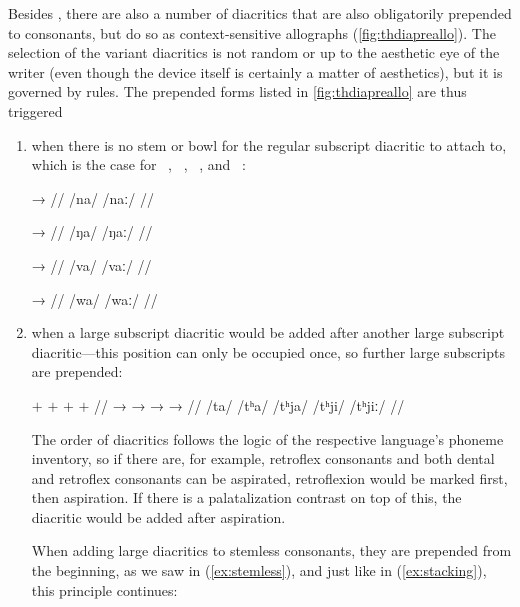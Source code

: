Besides , there are also a number of diacritics that are also 
obligatorily prepended to consonants, but do so as context-sensitive allographs 
(\autoref{fig:thdiapreallo}). The selection of the variant diacritics is not 
random or up to the aesthetic eye of the writer (even though the device itself 
is certainly a matter of aesthetics), but it is governed by rules. The 
prepended forms listed in \autoref{fig:thdiapreallo} are thus triggered 

\begin{enumerate}
\item when there is no stem or bowl for the regular subscript diacritic to 
	attach to, which is the case for ~, ~, 
	~, and ~:
	
	\begin{multicols}{2}
	\pex[lingstyle=thex,]\label{ex:stemless}
	\a\begingl
		\gla {} →  //
		\glb /na/ {} /naː/ //
	\endgl
	
	\a\begingl
		\gla {} →  //
		\glb /ŋa/ {} /ŋaː/ //
	\endgl
	
	\a\begingl
		\gla {} →  //
		\glb /va/ {} /vaː/ //
	\endgl
	
	\a\begingl
		\gla {} →  //
		\glb /wa/ {} /waː/ //
	\endgl
	
	\xe
	\end{multicols}

\item when a large subscript diacritic would be added after another large 
	subscript diacritic---this position can only be occupied once, so 
	further large subscripts are prepended:
	
	\ex[lingstyle=thex,everygla=\normalsize,everyglb=\upshape\Large,
		aboveglcskip=0.5em,numoffset=\leftmargin]\label{ex:stacking}
	\begingl
		\gla {} {$+$ } {} {$+$ } {} {$+$ } {}
			{$+$ } {} //
		\glb {} →  →  →  → 
			 //
		\glc /ta/ {} /tʰa/ {} /tʰja/ {} /tʰji/ {} /tʰjiː/ //
	\endgl\xe
	
	The order of diacritics follows the logic of the respective 
	language's phoneme inventory, so if there are, for example, 
	retroflex consonants and both dental and retroflex consonants can be 
	aspirated, retroflexion would be marked first, then aspiration. If 
	there is a palatalization contrast on top of this, the diacritic would 
	be added after aspiration.
	
	When adding large diacritics to stemless consonants, they are prepended 
	from the beginning, as we saw in (\ref{ex:stemless}), and just like in 
	(\ref{ex:stacking}), this principle continues:
	

\end{enumerate}
